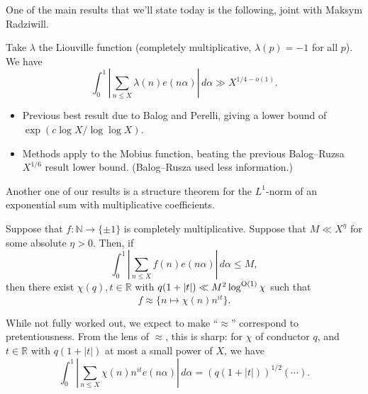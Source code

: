 \documentclass[reqno]{amsart} 
\begin{document}
One of the main results that we'll state today is the following, joint with Maksym Radziwill.
\begin{theorem}[P., Radziwill]
  Take $\lambda$ the Liouville function (completely multiplicative, $\lambda (p) = - 1$ for all $p$).  We have
  \begin{equation*}
    \int_0^1 \left\lvert \sum_{n \leq X} \lambda (n) e (n \alpha ) \right\rvert \, d \alpha
\gg X^{1/4 - o(1)}.    
\end{equation*}
\end{theorem}
\begin{itemize}
\item Previous best result due to Balog and Perelli, giving a lower bound of $\exp (c \log X / \log \log X)$.
\item Methods apply to the Mobius function, beating the previous Balog--Ruzsa $X^{1/6}$ result lower bound.  (Balog--Rusza used less information.)
\end{itemize}

Another one of our results is a structure theorem for the $L^1$-norm of an exponential sum with multiplicative coefficients.

\begin{theorem}[P. Radziwill]
  Suppose that $f : \mathbb{N} \rightarrow \{\pm 1\}$ is completely multiplicative.  Suppose that $M \ll X^{\eta }$ for some absolute $\eta > 0$.  Then, if
  \begin{equation*}
    \int_0^1 \left\lvert \sum_{n \leq X } f (n) e (n \alpha ) \right\rvert \, d \alpha
    \leq M,
  \end{equation*}
  then there exist $\chi (q), t \in \mathbb{R} $ with $q (1 + \lvert t \rvert) \ll M^2 \log^{\operatorname{O}(1)} \chi $ such that
  \begin{equation*}
f \approx \{n \mapsto \chi (n ) n^{i t}\}.
\end{equation*}
\end{theorem}
While not fully worked out, we expect to make ``$\approx$'' correspond to pretentiousness.  From the lens of $\approx$, this is sharp: for $\chi$ of conductor $q$, and $t \in \mathbb{R} $ with $q (1 + \lvert t \rvert)$ at most a small power of $X$, we have
\begin{equation*}
  \int_0^1 \left\lvert \sum_{n \leq X} \chi (n ) n^{i t} e (n \alpha ) \right\rvert \, d \alpha
  = (q (1 + \lvert t \rvert))^{1/2} (\dotsb).
\end{equation*}
\end{document}
